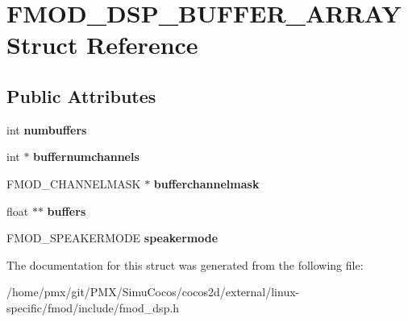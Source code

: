 \hypertarget{structFMOD__DSP__BUFFER__ARRAY}{}\section{F\+M\+O\+D\+\_\+\+D\+S\+P\+\_\+\+B\+U\+F\+F\+E\+R\+\_\+\+A\+R\+R\+AY Struct Reference}
\label{structFMOD__DSP__BUFFER__ARRAY}
\subsection*{Public Attributes}
\begin{DoxyCompactItemize}
\item 
\mbox{\label{structFMOD__DSP__BUFFER__ARRAY_a3b960754226681fb4b92b3b33eeec936}} 
int {\bfseries numbuffers}
\item 
\mbox{\label{structFMOD__DSP__BUFFER__ARRAY_aea46839a63dde0f8fa71c8a2f833dd89}} 
int $\ast$ {\bfseries buffernumchannels}
\item 
\mbox{\label{structFMOD__DSP__BUFFER__ARRAY_a1e3d222e09390c7b6afffbde03b54a12}} 
F\+M\+O\+D\+\_\+\+C\+H\+A\+N\+N\+E\+L\+M\+A\+SK $\ast$ {\bfseries bufferchannelmask}
\item 
\mbox{\label{structFMOD__DSP__BUFFER__ARRAY_a74f2207aeb531627a61ddc3d7248e4b0}} 
float $\ast$$\ast$ {\bfseries buffers}
\item 
\mbox{\label{structFMOD__DSP__BUFFER__ARRAY_a7d2f61def875095adaaa80125ced88e6}} 
F\+M\+O\+D\+\_\+\+S\+P\+E\+A\+K\+E\+R\+M\+O\+DE {\bfseries speakermode}
\end{DoxyCompactItemize}


The documentation for this struct was generated from the following file\+:\begin{DoxyCompactItemize}
\item 
/home/pmx/git/\+P\+M\+X/\+Simu\+Cocos/cocos2d/external/linux-\/specific/fmod/include/fmod\+\_\+dsp.\+h\end{DoxyCompactItemize}
